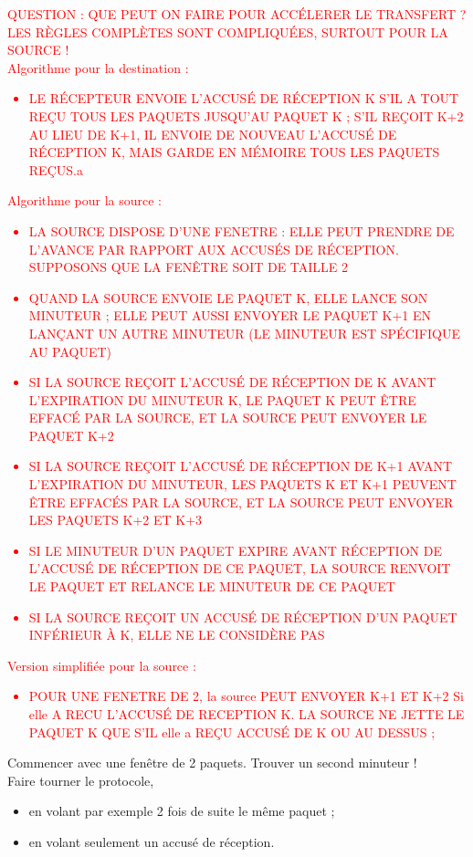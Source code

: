 \documentclass[10pt,a4paper]{article}
\begin{document}
\textcolor{red}{QUESTION : QUE PEUT ON FAIRE POUR ACCÉLERER LE TRANSFERT ?\\
LES RÈGLES COMPLÈTES SONT COMPLIQUÉES, SURTOUT POUR LA SOURCE !\\
Algorithme pour la destination :
\begin{itemize}
  \item LE RÉCEPTEUR ENVOIE L’ACCUSÉ DE RÉCEPTION K S’IL A TOUT REÇU TOUS LES
    PAQUETS JUSQU’AU PAQUET K ; S’IL REÇOIT K+2 AU LIEU DE K+1, IL ENVOIE DE
    NOUVEAU L’ACCUSÉ DE RÉCEPTION K, MAIS GARDE EN MÉMOIRE TOUS LES PAQUETS
    REÇUS.a
\end{itemize}
Algorithme pour la source :
\begin{itemize}
    \item LA SOURCE DISPOSE D’UNE FENETRE : ELLE PEUT PRENDRE DE L’AVANCE PAR
      RAPPORT AUX ACCUSÉS DE RÉCEPTION. SUPPOSONS QUE LA FENÊTRE SOIT DE TAILLE
      2
    \item QUAND LA SOURCE ENVOIE LE PAQUET K, ELLE LANCE SON MINUTEUR ; ELLE
      PEUT AUSSI ENVOYER LE PAQUET K+1 EN LANÇANT UN AUTRE MINUTEUR (LE
      MINUTEUR EST SPÉCIFIQUE AU PAQUET)
    \item SI LA SOURCE REÇOIT L’ACCUSÉ DE RÉCEPTION DE K AVANT L’EXPIRATION DU
      MINUTEUR K, LE PAQUET K PEUT ÊTRE EFFACÉ PAR LA SOURCE, ET LA SOURCE PEUT
      ENVOYER LE PAQUET K+2
    \item SI LA SOURCE REÇOIT L’ACCUSÉ DE RÉCEPTION DE K+1 AVANT L’EXPIRATION
      DU MINUTEUR, LES PAQUETS K ET K+1 PEUVENT ÊTRE EFFACÉS PAR LA SOURCE, ET
      LA SOURCE PEUT ENVOYER LES PAQUETS K+2 ET K+3
    \item SI LE MINUTEUR D’UN PAQUET EXPIRE AVANT RÉCEPTION DE L’ACCUSÉ DE
      RÉCEPTION DE CE PAQUET, LA SOURCE RENVOIT LE PAQUET ET RELANCE LE
      MINUTEUR DE CE PAQUET
    \item SI LA SOURCE REÇOIT UN ACCUSÉ DE RÉCEPTION D’UN PAQUET INFÉRIEUR À K,
      ELLE NE LE CONSIDÈRE PAS
  \end{itemize}
  Version simplifiée pour la source :
  \begin{itemize}
    \item POUR UNE FENETRE DE 2, la source PEUT ENVOYER K+1 ET K+2 Si elle A
      RECU L’ACCUSÉ DE RECEPTION K. LA SOURCE NE JETTE LE PAQUET K QUE S’IL
      elle a REÇU ACCUSÉ DE K OU AU DESSUS ; 
  \end{itemize}
}

Commencer avec une fenêtre de 2 paquets. Trouver un second minuteur !\\
Faire tourner le protocole, 
\begin{itemize}
  \item en volant par exemple 2 fois de suite le même paquet ;
  \item en volant seulement un accusé de réception.
\end{itemize}
\end{document}
